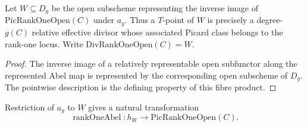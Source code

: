 \begin{definition}
  \label{pa-def:divRankOneOpen}
  \notready
  Let \(W\subseteq D_g\) be the open subscheme representing the inverse image of
  \(\mathrm{PicRankOneOpen}(C)\) under \(a_g\).  Thus a \(T\)-point of \(W\) is precisely a
  degree-\(g(C)\) relative effective divisor whose associated Picard class belongs to the
  rank-one locus.  Write \(\mathrm{DivRankOneOpen}(C)=W\).
\end{definition}
\begin{proof}
  The inverse image of a relatively representable open subfunctor along the represented Abel
  map is represented by the corresponding open subscheme of \(D_g\).  The pointwise
  description is the defining property of this fibre product.
\end{proof}

\begin{definition}
  \label{pa-def:rankOneAbel}
  \notready
  Restriction of \(a_g\) to \(W\) gives a natural transformation
  \[
    \operatorname{rankOneAbel}\colon
      h_W\longrightarrow\mathrm{PicRankOneOpen}(C).
  \]
\end{definition}

